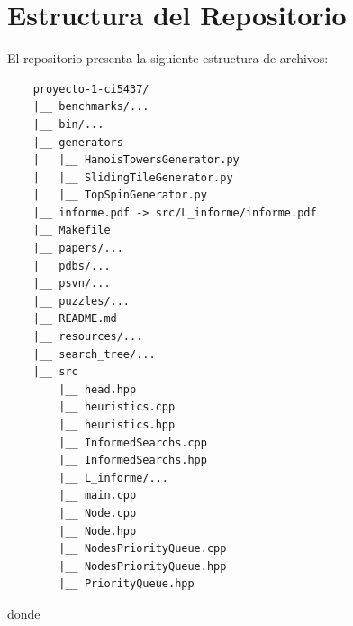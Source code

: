 \documentclass[a4paper,10pt]{article}
\begin{document}
\section{Estructura del Repositorio}
  El repositorio presenta la siguiente estructura de archivos:

  \begin{verbatim}
    proyecto-1-ci5437/
    |__ benchmarks/...
    |__ bin/...
    |__ generators
    |   |__ HanoisTowersGenerator.py
    |   |__ SlidingTileGenerator.py
    |   |__ TopSpinGenerator.py
    |__ informe.pdf -> src/L_informe/informe.pdf
    |__ Makefile
    |__ papers/...
    |__ pdbs/...
    |__ psvn/...
    |__ puzzles/...
    |__ README.md
    |__ resources/...
    |__ search_tree/...
    |__ src
        |__ head.hpp
        |__ heuristics.cpp
        |__ heuristics.hpp
        |__ InformedSearchs.cpp
        |__ InformedSearchs.hpp
        |__ L_informe/...
        |__ main.cpp
        |__ Node.cpp
        |__ Node.hpp
        |__ NodesPriorityQueue.cpp
        |__ NodesPriorityQueue.hpp
        |__ PriorityQueue.hpp
  \end{verbatim}

  donde 
\end{document}
